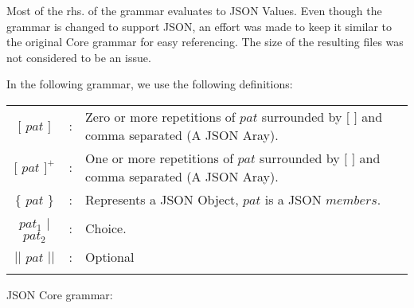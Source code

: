 
Most of the rhs. of the grammar evaluates to JSON Values. 
Even though the grammar is changed to support JSON, an effort was made to
keep it similar to the original Core grammar for easy referencing. The size
of the resulting files was not considered to be an issue.

In the following grammar, we use the following definitions:



\begin{footnotesize}
\begin{longtable}{ c c l }


$[$ $pat$ $]$ 		& : 	& Zero or more repetitions of $pat$ surrounded by $[$ $]$ and comma separated (A JSON Aray). 	\\
$[$ $pat$ $]^{+}$ 	& : 	& One or more repetitions of $pat$ surrounded by $[$ $]$ and comma separated (A JSON Aray). 	\\ 
$\{$ $pat$ $\}$		& :	& Represents a JSON Object, $pat$ is a JSON $members$.						\\
$pat_{1}$ $|$ $pat_{2}$	& :	& Choice.											\\
$||$ $pat$ $||$ 	& :	& Optional											\\
\\[0.01in]

\end{longtable}
\end{footnotesize}

JSON Core grammar:


